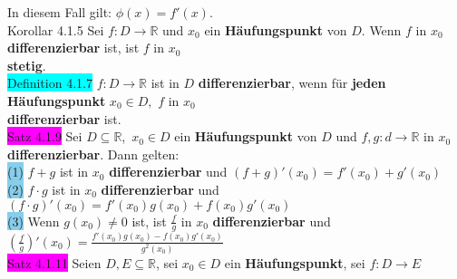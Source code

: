 \documentclass[10pt]{article}
\begin{document}
                In diesem Fall gilt: \textcolor{NavyBlue}{$\phi(x)=f'(x)$}.\\
\colorbox{BurntOrange}{Korollar 4.1.5} Sei \textcolor{NavyBlue}{$f:D\longrightarrow\mathbb{R}$}
                und \textcolor{NavyBlue}{$x_0$} ein \textbf{Häufungspunkt} von 
                \textcolor{NavyBlue}{$D$}. 
                Wenn \textcolor{NavyBlue}{$f$} in \textcolor{NavyBlue}{$x_0$} 
                \textbf{differenzierbar} ist, ist \textcolor{NavyBlue}{$f$} in 
                \textcolor{NavyBlue}{$x_0$} \\
        \indent \textbf{stetig}.\\
\colorbox{cyan}{Definition 4.1.7} \textcolor{NavyBlue}{$f:D\longrightarrow\mathbb{R}$} 
                ist in \textcolor{NavyBlue}{$D$} \textbf{differenzierbar}, 
                wenn für \textbf{jeden Häufungspunkt} $x_0\in D,$
                \textcolor{NavyBlue}{$f$} in \textcolor{NavyBlue}{$x_0$} \\
        \indent \textbf{differenzierbar} ist.\\
\colorbox{magenta}{Satz 4.1.9} Sei \textcolor{NavyBlue}{$D\subseteq\mathbb{R}$},\,
                \textcolor{NavyBlue}{$x_0\in D$} 
                ein \textbf{Häufungspunkt} von \textcolor{NavyBlue}{$D$} 
                und \textcolor{NavyBlue}{$f,g:d\longrightarrow\mathbb{R}$} in 
                \textcolor{NavyBlue}{$x_0$} \textbf{differenzierbar}. Dann gelten:\\
        \indent \colorbox{SkyBlue}{(1)} \textcolor{NavyBlue}{$f+g$}
                 ist in \textcolor{NavyBlue}{$x_0$} \textbf{differenzierbar} und 
                 \textcolor{NavyBlue}{$(f+g)'(x_0)=f'(x_0)+g'(x_0)$} \\
        \indent \colorbox{SkyBlue}{(2)} \textcolor{NavyBlue}{$f\cdot g$} 
                ist in \textcolor{NavyBlue}{$x_0$} \textbf{differenzierbar} und 
                \textcolor{NavyBlue}{$(f\cdot g)'(x_0)=f'(x_0)g(x_0)+f(x_0)g'(x_0)$} \\
        \indent \colorbox{SkyBlue}{(3)} Wenn \textcolor{NavyBlue}{$g(x_0)\neq0$} ist, ist 
                \textcolor{NavyBlue}{$\frac{f}{g}$} in 
                \textcolor{NavyBlue}{$x_0$} \textbf{differenzierbar} und 
                \textcolor{NavyBlue}{
                $(\frac{f}{g})'(x_0)=\frac{f'(x_0)g(x_0)-f(x_0)g'(x_0)}{g^2(x_0)}$} \\
\colorbox{magenta}{Satz 4.1.11} Seien \textcolor{NavyBlue}{$D,E\subseteq\mathbb{R}$}, 
                sei \textcolor{NavyBlue}{$x_0\in D$}
                ein \textbf{Häufungspunkt}, sei \textcolor{NavyBlue}{$f:D\longrightarrow E$}
\end{document}
